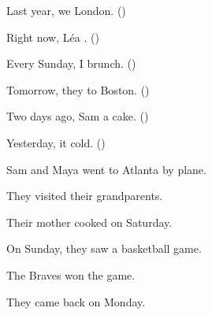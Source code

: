 \begin{questions}
\item Last year, we  London. \hfill ()
\item Right now, Léa . \hfill ()
\item Every Sunday, I  brunch. \hfill ()
\item Tomorrow, they  to Boston. \hfill ()
\item Two days ago, Sam  a cake. \hfill ()
\item Yesterday, it  cold. \hfill ()
\end{questions}

\begin{anglais}
\begin{questions}[2]
\item Sam and Maya went to Atlanta by plane. \hfill{}
\item They visited their grandparents. \hfill{}
\item Their mother cooked on Saturday. \hfill{}
\item On Sunday, they saw a basketball game. \hfill{}
\item The Braves won the game. \hfill{}
\item They came back on Monday. \hfill{}
\end{questions}
\end{anglais}

